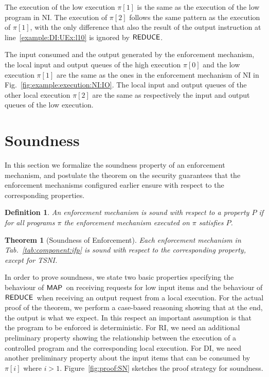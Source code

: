 \documentclass[10pt,a4paper,oneside]{article}
\newtheorem{definition}{Definition}[section]
\newtheorem{theorem}{Theorem}[section]
\def\sanserif#1{\ensuremath{\sf #1}}
\def\REDUCE{\ensuremath{\sanserif{REDUCE}}}
\def\MAP{\ensuremath{\sanserif{MAP}}}
\def\Prog{\ensuremath{\pi}}
\def\Progl#1{\ensuremath{\Prog[#1]}}
\begin{document}
The execution of the low execution \Progl{1} is the same as the execution of the low program in NI. The execution of \Progl{2} follows the same pattern as the execution of \Progl{1}, with the only difference that also the result of the output instruction at line~\ref{example:DI:UEx:l10} is ignored by \REDUCE.

The input consumed and the output generated by the enforcement mechanism, the local input and output queues of the high execution \Progl{0} and the low execution \Progl{1} are the same as the ones in the enforcement mechanism of NI in Fig.~\ref{fig:example:execution:NI:IO}. The local input and output queues of the other local execution \Progl{2} are the same as respectively the input and output queues of the low execution.






\section{Soundness} \label{sec:soundness}
In this section we formalize the soundness property of an enforcement mechanism, and postulate the theorem on the security guarantees that the enforcement mechanisms configured earlier ensure with respect to the corresponding properties.

\begin{definition}\label{def:soundness}
An enforcement mechanism is \emph{sound} with respect to a property $P$ if for all programs $\pi$ the enforcement mechanism executed on $\pi$ satisfies $P$.\end{definition}

\begin{theorem}[Soundness of Enforcement] \label{thm:soundess}
	Each enforcement mechanism in Tab.~\ref{tab:component:ifp} is sound with respect to the corresponding property, except for TSNI.
\end{theorem}
In order to prove soundness, we state two basic properties specifying the behaviour of \MAP\ on receiving requests for low input items and the behaviour of \REDUCE\ when receiving an output request from a local execution. For the actual proof of the theorem, we perform a case-based reasoning showing that at the end, the output is what we expect. In this respect an important assumption is that the program to be enforced is deterministic.  For RI, we need an additional preliminary property showing the relationship between the execution of a controlled program and the corresponding local execution. For DI, we need another preliminary property about the input items that can be consumed by \Progl{i} where $i > 1$. Figure~\ref{fig:proof:SN} sketches the proof strategy for soundness.
\end{document}
